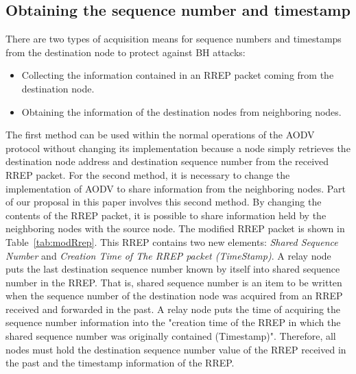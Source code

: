 \documentclass[conference]{IEEEtran}
\begin{document}
\subsection{Obtaining the sequence number and timestamp}
There are two types of acquisition means for sequence numbers and timestamps from the destination node to protect against BH attacks:

\begin{itemize}
  \item Collecting the information contained in an RREP packet coming from the destination node.
  \item Obtaining the information of the destination nodes from neighboring nodes.
\end{itemize}

The first method can be used within the normal operations of the AODV protocol without changing its implementation because a node simply retrieves the destination node address and destination sequence number from the received RREP packet. For the second method, it is necessary to change the implementation of AODV to share information from the neighboring nodes. Part of our proposal in this paper involves this second method. By changing the contents of the RREP packet, it is possible to share information held by the neighboring nodes with the source node. The modified RREP packet is shown in \mbox{Table \ref{tab:modRrep}}. This RREP contains two new elements: {\it Shared Sequence Number} and {\it Creation Time of The RREP packet (TimeStamp)}. A relay node puts the last destination sequence number known by itself into shared sequence number in the RREP. That is, shared sequence number is an item to be written when the sequence number of the destination node was acquired from an RREP received and forwarded in the past. A relay node puts the time of acquiring the sequence number information into the "creation time of the RREP in which the shared sequence number was originally contained (Timestamp)". Therefore, all nodes must hold the destination sequence number value of the RREP received in the past and the timestamp information of the RREP.
\end{document}

